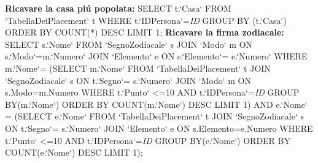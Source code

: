\textbf{Ricavare la casa piú popolata:}\newline
SELECT t.`Casa` FROM `TabellaDeiPlacement` t WHERE t.`IDPersona`=\textit{ID} GROUP BY (t.`Casa`) ORDER BY COUNT(*) DESC LIMIT 1;\newline\newline
\textbf{Ricavare la firma zodiacale:}\newline
SELECT s.`Nome` FROM `SegnoZodiacale` s JOIN `Modo` m ON s.`Modo`=m.`Numero` JOIN `Elemento` e ON s.`Elemento`= e.`Numero` WHERE m.`Nome`= \newline\newline
(SELECT m.`Nome` FROM `TabellaDeiPlacement` t JOIN `SegnoZodiacale` s ON t.`Segno`= s.`Numero`  JOIN `Modo` m ON s.Modo=m.Numero WHERE t.`Punto` <=10 AND t.`IDPersona`=\textit{ID} GROUP BY(m.`Nome`) ORDER BY COUNT(m.`Nome`) DESC LIMIT 1) \newline\newline
AND e.`Nome` =
\newline\newline
(SELECT e.`Nome` FROM `TabellaDeiPlacement` t JOIN `SegnoZodiacale` s ON t.`Segno`= s.`Numero`  JOIN `Elemento` e ON s.Elemento=e.Numero WHERE t.`Punto` <=10 AND t.`IDPersona`=\textit{ID} GROUP BY(e.`Nome`) ORDER BY COUNT(e.`Nome`) DESC LIMIT 1);
